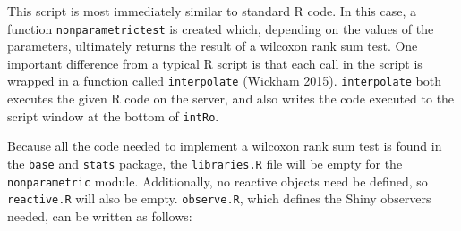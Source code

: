 \documentclass[12pt,]{article}
\newenvironment{Shaded}{\begin{snugshade}}{\end{snugshade}}
\newcommand{\KeywordTok}[1]{\textcolor[rgb]{0.13,0.29,0.53}{\textbf{{#1}}}}
\newcommand{\DataTypeTok}[1]{\textcolor[rgb]{0.13,0.29,0.53}{{#1}}}
\newcommand{\StringTok}[1]{\textcolor[rgb]{0.31,0.60,0.02}{{#1}}}
\newcommand{\NormalTok}[1]{{#1}}
\begin{document}
\begin{Shaded}
\end{Shaded}

This script is most immediately similar to standard R code. In this
case, a function \texttt{nonparametrictest} is created which, depending
on the values of the parameters, ultimately returns the result of a
wilcoxon rank sum test. One important difference from a typical R script
is that each call in the script is wrapped in a function called
\texttt{interpolate} (Wickham 2015). \texttt{interpolate} both executes
the given R code on the server, and also writes the code executed to the
script window at the bottom of \texttt{intRo}.

Because all the code needed to implement a wilcoxon rank sum test is
found in the \texttt{base} and \texttt{stats} package, the
\texttt{libraries.R} file will be empty for the \texttt{nonparametric}
module. Additionally, no reactive objects need be defined, so
\texttt{reactive.R} will also be empty. \texttt{observe.R}, which
defines the Shiny observers needed, can be written as follows:
\end{document}
